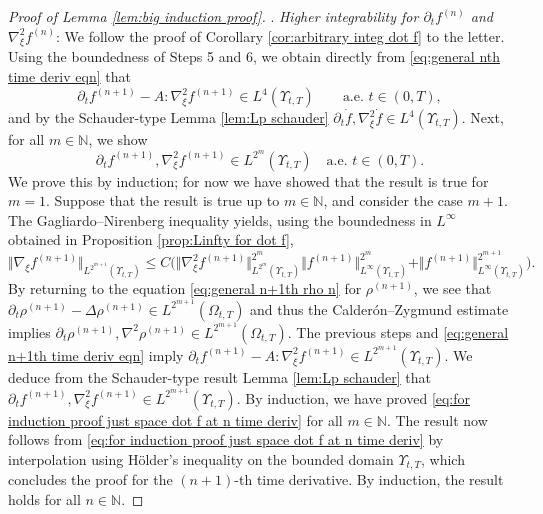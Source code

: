 \documentclass[11pt,a4paper,reqno]{amsart}
\theoremstyle{remark}
\theoremstyle{definition}
\numberwithin{equation}{section}
\newcommand{\bxi}{\xi}
\begin{document}
\begin{proof}[Proof of Lemma \ref{lem:big induction proof}]
. \textit{Higher integrability for $\partial_t f^{(n)}$ and $\nabla^2_{\bxi} f^{(n)}$}: We follow the proof of Corollary \ref{cor:arbitrary integ dot f} to the letter. Using the boundedness of Steps 5 and 6, we obtain directly from \eqref{eq:general nth time deriv eqn} that 
\begin{equation*}
    \partial_t f^{(n+1)} - A:\nabla^2_{\bxi} f^{(n+1)} \in L^{4}(\Upsilon_{t,T}) \qquad \text{a.e.~}t\in(0,T), 
\end{equation*}
and by the Schauder-type Lemma \ref{lem:Lp schauder} $\partial_t \dot{f} , \nabla^2_{\bxi} \dot{f} \in L^{4}(\Upsilon_{t,T})$. Next, for all $m\in\mathbb{N}$, we show 
\begin{equation}\label{eq:for induction proof just space dot f at n time deriv}
    \partial_t f^{(n+1)}, \nabla^2_{\bxi} f^{(n+1)} \in L^{2^m}(\Upsilon_{t,T}) \quad \text{a.e.~}t\in(0,T). 
\end{equation}
We prove this by induction; for now we have showed that the result is true for $m=1$. Suppose that the result is true up to $m\in\mathbb{N}$, and consider the case $m+1$. The Gagliardo--Nirenberg inequality yields, using the boundedness in $L^\infty$ obtained in Proposition \ref{prop:Linfty for dot f}, 
\begin{equation*}
    \Vert \nabla_{\bxi} {f}^{(n+1)} \Vert_{L^{2^{m+1}}(\Upsilon_{t,T})} \leq C \Big( \Vert \nabla_{\bxi}^2 {f}^{(n+1)}  \Vert_{L^{2^{m}}(\Upsilon_{t,T})}^{2^{m}} \Vert {f}^{(n+1)} \Vert_{L^\infty(\Upsilon_{t,T})}^{2^{m}} + \Vert {f}^{(n+1)} \Vert_{L^\infty(\Upsilon_{t,T})}^{2^{m+1}} \Big). 
\end{equation*}
By returning to the equation \eqref{eq:general n+1th rho n} for $\rho^{(n+1)}$, we see that $\partial_t \rho^{(n+1)} - \Delta \rho^{(n+1)} \in L^{2^{m+1}}(\Omega_{t,T})$ and thus the Calder\'on--Zygmund estimate implies $\partial_t \rho^{(n+1)} , \nabla^2 \rho^{(n+1)} \in L^{2^{m+1}}(\Omega_{t,T})$. The previous steps and \eqref{eq:general n+1th time deriv eqn} imply $\partial_t f^{(n+1)} - A:\nabla^2_{\bxi} f^{(n+1)} \in L^{2^{m+1}}(\Upsilon_{t,T})$. We deduce from the Schauder-type result Lemma \ref{lem:Lp schauder} that $\partial_t f^{(n+1)}, \nabla^2_{\bxi} f^{(n+1)} \in L^{2^{m+1}}(\Upsilon_{t,T})$. By induction, we have proved \eqref{eq:for induction proof just space dot f at n time deriv} for all $m\in\mathbb{N}$. The result now follows from \eqref{eq:for induction proof just space dot f at n time deriv} by interpolation using H\"older's inequality on the bounded domain $\Upsilon_{t,T}$, which concludes the proof for the $(n+1)$-th time derivative. By induction, the result holds for all $n\in\mathbb{N}$. 
\end{proof}
\end{document}
